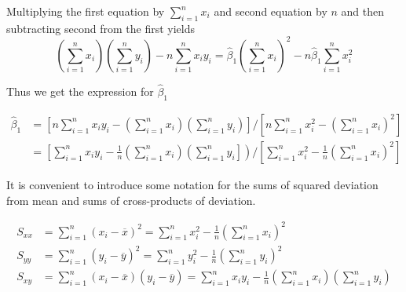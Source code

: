 \documentclass[twoside]{book}
\begin{document}
Multiplying the first equation by $\sum_{i=1}^n x_i$ and second equation by $n$ and then subtracting second from the first yields
$$\left(\sum_{i=1}^{n} x_i\right)\left(\sum_{i=1}^{n} y_i\right) - n\sum_{i=1}^{n} x_i y_i = \hat{\beta}_1\left(\sum_{i=1}^{n} x_i\right)^2 - n\hat{\beta}_1\sum_{i=1}^{n} x_i^2  $$

Thus we get the expression for $\hat{\beta}_1$


\begin{align*}
\hat{\beta}_1 &=
\left[
n\sum_{i=1}^{n} x_i y_i
-
\left(\sum_{i=1}^{n} x_i\right)\left(\sum_{i=1}^{n} y_i\right)
\right]
\bigg/
\left[
n\sum_{i=1}^{n} x_i^2
-
\left(\sum_{i=1}^{n} x_i\right)^2
\right]
\\
&=
\left[
\sum_{i=1}^{n} x_i y_i
-
\frac{1}{n}\left(\sum_{i=1}^{n} x_i\right)\left(\sum_{i=1}^{n} y_i\right]
\right)
\bigg/
\left[
\sum_{i=1}^{n} x_i^2
-
\frac{1}{n}\left(\sum_{i=1}^{n} x_i\right)^2
\right]
\end{align*}


It is convenient to introduce some notation for the sums of squared deviation from mean and sums of cross-products of deviation.

\begin{textbox}
\begin{align*}
S_{xx} &= \sum_{i=1}^{n} (x_i - \overline{x})^2 = \sum_{i=1}^{n} x_i^2 - \frac{1}{n}\left( \sum_{i=1}^{n} x_i \right)^2 \\
S_{yy} &= \sum_{i=1}^{n} (y_i - \overline{y})^2 = \sum_{i=1}^{n} y_i^2 - \frac{1}{n}\left( \sum_{i=1}^{n} y_i \right)^2 \\
S_{xy} &= \sum_{i=1}^{n} (x_i - \overline{x})(y_i - \overline{y}) = \sum_{i=1}^{n} x_i y_i - \frac{1}{n}\left( \sum_{i=1}^{n} x_i \right) \left( \sum_{i=1}^{n} y_i \right)
\end{align*}
\end{textbox}
\end{document}
